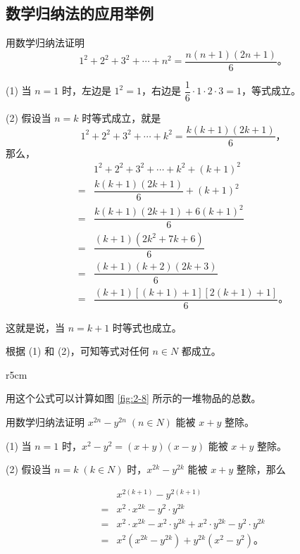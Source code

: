 \subsection{数学归纳法的应用举例}\label{subsec:2-5}

\liti 用数学归纳法证明
$$ 1^2 + 2^2 + 3^2 + \cdots + n^2 = \dfrac{n(n + 1)(2n + 1)}{6} \text{。} $$

\zhengming (1) 当 $n = 1$ 时，左边是 $1^2 = 1$，右边是 $\dfrac{1}{6} \cdot 1 \cdot 2 \cdot 3 = 1$，等式成立。

(2) 假设当 $n = k$ 时等式成立，就是
$$ 1^2 + 2^2 + 3^2 + \cdots + k^2 = \dfrac{k(k + 1)(2k + 1)}{6} \text{，} $$
那么，
\begin{align*}
      & 1^2 + 2^2 + 3^2 + \cdots + k^2 + (k + 1)^2 \\
    = & \dfrac{k(k + 1)(2k + 1)}{6} + (k + 1)^2 \\
    = & \dfrac{k(k + 1)(2k + 1) + 6(k + 1)^2}{6} \\
    = & \dfrac{(k + 1)(2k^2 + 7k + 6)}{6} \\
    = & \dfrac{(k + 1)(k + 2)(2k + 3)}{6} \\
    = & \dfrac{(k + 1)[(k + 1) + 1][2(k + 1) + 1]}{6} \text{。}
\end{align*}

这就是说，当 $n = k + 1$ 时等式也成立。

根据 (1) 和 (2)，可知等式对任何 $n \in N$ 都成立。

\begin{wrapfigure}[10]{r}{5cm}
    \centering
    
    \caption{}\label{fig:2-8}
\end{wrapfigure}

用这个公式可以计算如图 \ref{fig:2-8} 所示的一堆物品的总数。

\liti 用数学归纳法证明 $x^{2n} - y^{2n} \; (n \in N)$ 能被 $x + y$ 整除。

\zhengming (1) 当 $n = 1$ 时，$x^2 - y^2 = (x + y)(x - y)$ 能被 $x + y$ 整除。

(2) 假设当 $n = k\; (k \in N)$ 时，$x^{2k} - y^{2k}$ 能被 $x + y$ 整除，那么

\begin{align*}
      & x^{2(k+1)} - y^{2(k+1)} \\
    = & x^2 \cdot x^{2k} - y^2 \cdot y^{2k} \\
    = & x^2 \cdot x^{2k} - x^2 \cdot y^{2k} + x^2 \cdot y^{2k} - y^2 \cdot y^{2k} \\
    = & x^2(x^{2k} - y^{2k}) + y^{2k}(x^2 - y^2) \text{。}
\end{align*}

